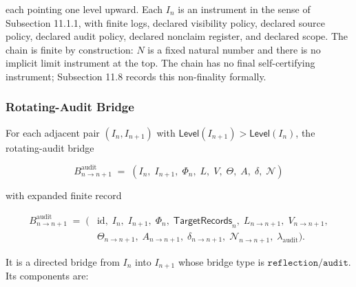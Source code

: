 \documentclass[11pt]{article}
\theoremstyle{definition}
\begin{document}
each pointing one level upward. Each \(I_n\) is an instrument in the sense of Subsection 11.1.1, with finite logs, declared visibility policy, declared source policy, declared audit policy, declared nonclaim register, and declared scope. The chain is finite by construction: \(N\) is a fixed natural number and there is no implicit limit instrument at the top. The chain has no final self-certifying instrument; Subsection 11.8 records this non-finality formally.

\subsubsection{Rotating-Audit Bridge}

For each adjacent pair \((I_n,I_{n+1})\) with \(\mathsf{Level}(I_{n+1})>\mathsf{Level}(I_n)\), the rotating-audit bridge

\[
B^{\mathrm{audit}}_{n\to n+1}\;=\;(I_n,\;I_{n+1},\;\Phi_n,\;L,\;V,\;\Theta,\;A,\;\delta,\;\mathcal N)
\]

with expanded finite record

\[
\begin{aligned}
B^{\mathrm{audit}}_{n\to n+1}\;=\;(&\mathrm{id},\;I_n,\;I_{n+1},\;\Phi_n,\;\mathsf{TargetRecords}_n,\;L_{n\to n+1},\;V_{n\to n+1},\\
&\Theta_{n\to n+1},\;A_{n\to n+1},\;\delta_{n\to n+1},\;\mathcal N_{n\to n+1},\;\lambda_{\mathrm{audit}}).
\end{aligned}
\]

It is a directed bridge from \(I_n\) into \(I_{n+1}\) whose bridge type is \(\texttt{reflection/audit}\). Its components are:
\end{document}
